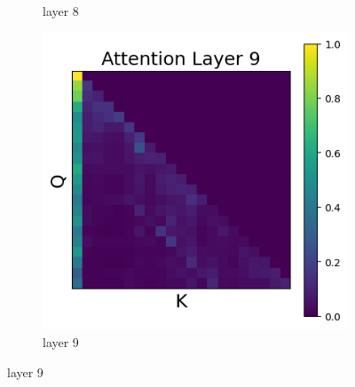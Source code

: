 \documentclass[11pt]{article}
\begin{document}
\begin{figure}[t]
\begin{subfigure}[t]{0.24\textwidth}
    \caption{layer 8}
  \end{subfigure}\hfill
      \begin{subfigure}[t]{0.24\textwidth}
    \centering
    \includegraphics[width=1.4\columnwidth]{figures/intervention5/layer_9.png}
    \caption{layer 9}
  \end{subfigure}\hfill
    

\end{figure}
\end{document}

